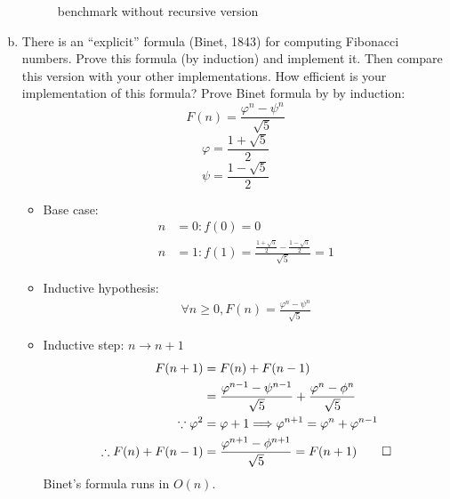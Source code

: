 \documentclass{article}
\begin{document}
\begin{flushleft}
\begin{enumerate}[(a)]
\begin{figure}
\begin{minipage}{0.48\textwidth}
        \caption{benchmark without recursive version}
        \end{minipage}
    \end{figure}
    \item  There is an “explicit” formula (Binet, 1843) for computing Fibonacci numbers. Prove this
    formula (by induction) and implement it. Then compare this version with your other implementations. 
    How efficient is your implementation of this formula?  
    \newline
    Prove Binet formula by by induction:
    \begin{equation}
        F(n) = \frac{\varphi^n - \psi ^n}{\sqrt{5}}
    \end{equation}
    \begin{equation}
        \varphi = \frac{1 + \sqrt{5}}{2}
    \end{equation}
    \begin{equation}
        \psi = \frac{1 - \sqrt{5}}{2}
    \end{equation}
    \begin{itemize}
        \item Base case: 
        \begin{align*}
            n &= 0: f(0) = 0 \\ 
            n &= 1: f(1) = \frac{\frac{1 + \sqrt{5}}{2} - \frac{1 - \sqrt{5}}{2}}{\sqrt{5}} = 1
        \end{align*}
        \item Inductive hypothesis:
        \begin{align*}
            \forall n \geq 0, F(n) = \frac{\varphi^n - \psi ^n}{\sqrt{5}}
        \end{align*}
        \item Inductive step: $n \longrightarrow n + 1$
        \begin{align*}
            F(n + 1) &= F(n) + F(n - 1) \\
            &= \frac{\varphi^{n-1} - \psi^{n - 1}}{\sqrt{5}} + \frac{\varphi^n - \phi^n}{\sqrt{5}} \\
            \because \varphi ^ 2 &= \varphi + 1 \Longrightarrow \varphi ^ {n + 1} = \varphi ^ n + \varphi ^ {n - 1} \\
            \therefore F(n) + F(n - 1) &= \frac{\varphi^{n + 1} - \phi^{n + 1}}{\sqrt{5}} = F(n + 1) \qed
        \end{align*}
        \newline
        Binet's formula runs in $O(n)$. 
    \begin{figure}[H]

\end{figure}
\end{itemize}
\end{enumerate}
\end{flushleft}
\end{document}
